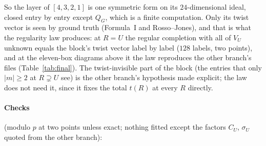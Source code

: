 \documentclass[11pt]{article}
\begin{document}
So the layer of $[4,3,2,1]$ is one symmetric form on its $24$-dimensional ideal, closed entry by entry except $Q_G$,
which is a finite computation.  Only its twist vector is seen by ground truth (Formula~I and Rosso--Jones), and that is
what the regularity law produces: at $R=U$ the regular completion with all of $V_U$ unknown equals the block's twist
vector label by label ($128$ labels, two points), and at the eleven-box diagrams above it the law reproduces the other
branch's files (Table~\ref{tab:final}).  The twist-invisible part of the block (the entries that only $|m|\ge2$ at
$R\supsetneq U$ see) is the other branch's hypothesis made explicit; the law does not need it, since it fixes the total
$t(R)$ at every $R$ directly.

\paragraph{Checks} (modulo $p$ at two points unless exact; nothing fitted except the factors $C_U$, $\sigma_U$ quoted
from the other branch):
\end{document}
